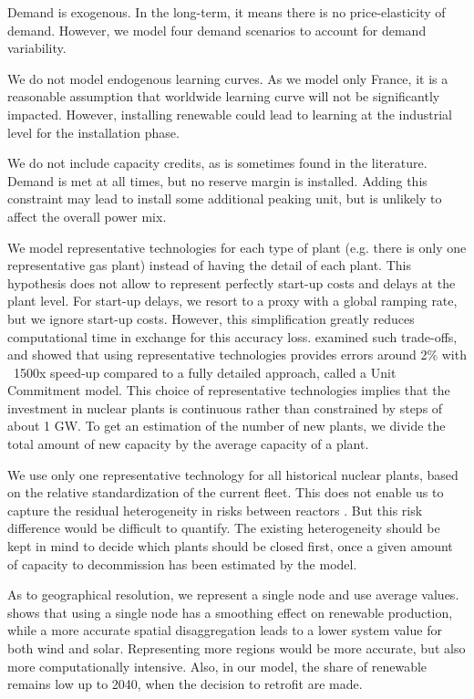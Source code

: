Demand is exogenous.
In the long-term, it means there is no price-elasticity of demand.
However, we model four demand scenarios to account for demand variability.

We do not model endogenous learning curves. As we model only France, it is a reasonable assumption that worldwide learning curve will not be significantly impacted. However, installing renewable could lead to learning at the industrial level for the installation phase.

We do not include capacity credits, as is sometimes found in the literature. Demand is met at all times, but no reserve margin is installed. Adding this constraint may lead to install some additional peaking unit, but is unlikely to affect the overall power mix.

We model representative technologies for each type of plant (e.g. there is only one representative gas plant) instead of having the detail of each plant.
This hypothesis does not allow to represent perfectly start-up costs and delays at the plant level. For start-up delays, we resort to a proxy with a global ramping rate, but we ignore start-up costs. However, this simplification greatly reduces computational time in exchange for this accuracy loss. \citet{Palmintier2014} examined such trade-offs, and showed that using representative technologies provides errors around 2\% with ~1500x speed-up compared to a fully detailed approach, called a Unit Commitment model. 
This choice of representative technologies implies that the investment in nuclear plants is continuous rather than constrained by steps of about 1 GW. To get an estimation of the number of new plants, we divide the total amount of new capacity by the average capacity of a plant.

We use only one representative technology for all historical nuclear plants, based on the relative standardization of the current fleet. This does not enable us to capture the residual heterogeneity in risks between reactors \citep{GreenPeace2013}. But this risk difference would be difficult to quantify. 
The existing heterogeneity should be kept in mind to decide which plants should be closed first, once a given amount of capacity to decommission has been estimated by the model. 

As to geographical resolution, we represent a single node and use average values. \citet{Simoes2017} shows that using a single node has a smoothing effect on renewable production, while a more accurate spatial disaggregation leads to a lower system value for both wind and solar. Representing more regions would be more accurate, but also more computationally intensive. Also, in our model, the share of renewable remains low up to 2040, when the decision to retrofit are made.

